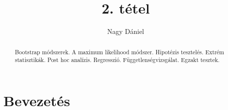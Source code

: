 \documentclass[12pt]{article}
\theoremstyle{plain}
\begin{document}
\title{2. tétel}
\author{Nagy Dániel}

\maketitle


\begin{abstract}
    Bootstrap módszerek. A maximum likelihood módszer. Hipotézis tesztelés. Extrém statisztikák.
    Post hoc analízis. Regresszió. Függetlenségvizsgálat. Egzakt tesztek.
\end{abstract}

\vfill

\tableofcontents

\newpage

\section{Bevezetés}
\end{document}
